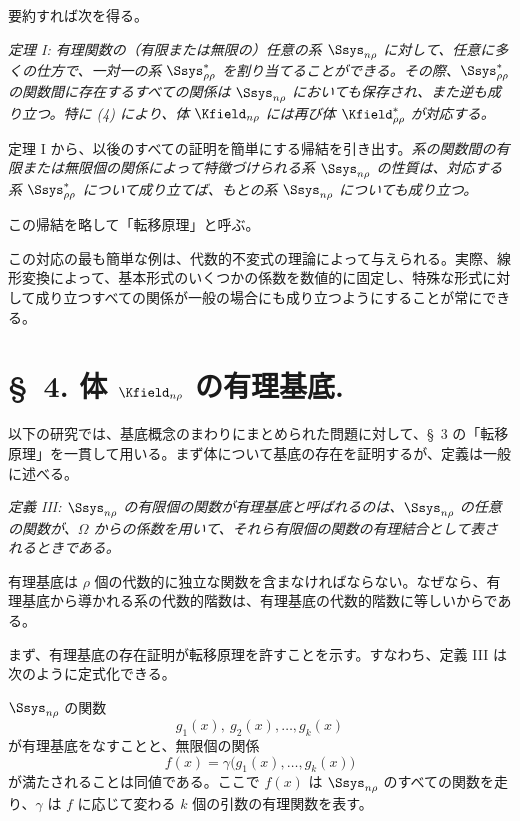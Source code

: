 \documentclass[11pt]{article}
\begin{document}
要約すれば次を得る。

\emph{定理 I: 有理関数の（有限または無限の）任意の系 $\Ssys_{n\rho}$ に対して、任意に多くの仕方で、一対一の系 $\Ssys^*_{\rho\rho}$ を割り当てることができる。その際、$\Ssys^*_{\rho\rho}$ の関数間に存在するすべての関係は $\Ssys_{n\rho}$ においても保存され、また逆も成り立つ。特に (4) により、体 $\Kfield_{n\rho}$ には再び体 $\Kfield^*_{\rho\rho}$ が対応する。}

定理 I から、以後のすべての証明を簡単にする帰結を引き出す。\emph{系の関数間の有限または無限個の関係によって特徴づけられる系 $\Ssys_{n\rho}$ の性質は、対応する系 $\Ssys^*_{\rho\rho}$ について成り立てば、もとの系 $\Ssys_{n\rho}$ についても成り立つ。}

この帰結を略して「転移原理」と呼ぶ。

\providecommand{\Lsys}{\mathfrak{L}}
\providecommand{\Jdom}{\mathfrak{J}}

\clearpage
この対応の最も簡単な例は、代数的不変式の理論によって与えられる。実際、線形変換によって、基本形式のいくつかの係数を数値的に固定し、特殊な形式に対して成り立つすべての関係が一般の場合にも成り立つようにすることが常にできる。

\section*{\S\ 4. 体 $\Kfield_{n\rho}$ の有理基底.}

以下の研究では、基底概念のまわりにまとめられた問題に対して、\S\ 3 の「転移原理」を一貫して用いる。まず体について基底の存在を証明するが、定義は一般に述べる。

\emph{定義 III: $\Ssys_{n\rho}$ の有限個の関数が有理基底と呼ばれるのは、$\Ssys_{n\rho}$ の任意の関数が、$\Omega$ からの係数を用いて、それら有限個の関数の有理結合として表されるときである。}

有理基底は $\rho$ 個の代数的に独立な関数を含まなければならない。なぜなら、有理基底から導かれる系の代数的階数は、有理基底の代数的階数に等しいからである。

まず、有理基底の存在証明が転移原理を許すことを示す。すなわち、定義 III は次のように定式化できる。

$\Ssys_{n\rho}$ の関数
\[
  g_1(x),\ g_2(x),\ldots, g_k(x)
\]
が有理基底をなすことと、無限個の関係
\begin{equation}
  f(x)=\gamma\bigl(g_1(x),\ldots,g_k(x)\bigr)
\tag{1}
\end{equation}
が満たされることは同値である。ここで $f(x)$ は $\Ssys_{n\rho}$ のすべての関数を走り、$\gamma$ は $f$ に応じて変わる $k$ 個の引数の有理関数を表す。
\end{document}
